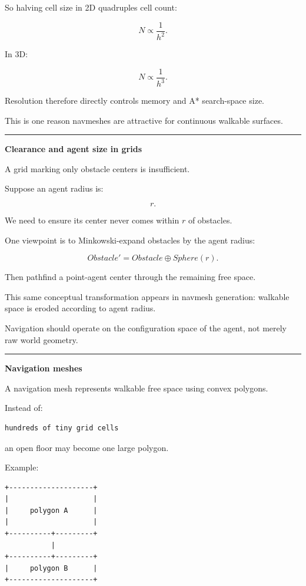 So halving cell size in 2D quadruples cell count:

\[
N\propto\frac1{h^2}.
\]

In 3D:

\[
N\propto\frac1{h^3}.
\]

Resolution therefore directly controls memory and A* search-space size.

This is one reason navmeshes are attractive for continuous walkable surfaces.

\begin{center}\rule{0.5\linewidth}{0.5pt}\end{center}

\textbf{Clearance and agent size in grids}

A grid marking only obstacle centers is insufficient.

Suppose an agent radius is:

\[
r.
\]

We need to ensure its center never comes within \(r\) of obstacles.

One viewpoint is to Minkowski-expand obstacles by the agent radius:

\[
Obstacle'
=
Obstacle\oplus Sphere(r).
\]

Then pathfind a point-agent center through the remaining free space.

This same conceptual transformation appears in navmesh generation: walkable space is eroded according to agent radius.

Navigation should operate on the configuration space of the agent, not merely raw world geometry.

\begin{center}\rule{0.5\linewidth}{0.5pt}\end{center}

\textbf{Navigation meshes}

A navigation mesh represents walkable free space using convex polygons.

Instead of:

\begin{verbatim}
hundreds of tiny grid cells
\end{verbatim}

an open floor may become one large polygon.

Example:

\begin{verbatim}
+--------------------+
|                    |
|     polygon A      |
|                    |
+----------+---------+
           |
+----------+---------+
|     polygon B      |
+--------------------+
\end{verbatim}

